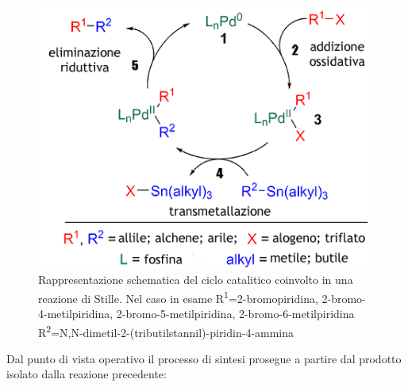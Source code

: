 \documentclass[a4paper, 12pt]{article}
\begin{document}
\begin{figure}[H]
	\centering
	\includegraphics[width=.9\linewidth]{immagini/stille.png}
	\caption{Rappresentazione schematica del ciclo catalitico coinvolto in una reazione di Stille. Nel caso in esame R\textsuperscript{1}=2-bromopiridina, 2-bromo-4-metilpiridina, 2-bromo-5-metilpiridina, 2-bromo-6-metilpiridina R\textsuperscript{2}=N,N-dimetil-2-(tributilstannil)-piridin-4-ammina}
	\label{fig:stille}
\end{figure}

Dal punto di vista operativo il processo di sintesi prosegue a partire dal prodotto isolato dalla reazione precedente:
\end{document}
